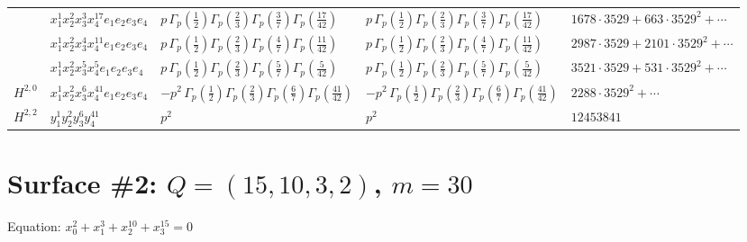 \documentclass[11pt]{article}
\begin{document}
\begin{table}[ht]
{\begin{tabular}{@{}lllll@{}}
 & $x_{1}^{1} x_{2}^{2} x_{3}^{3} x_{4}^{17}  e_{1} e_{2} e_{3} e_{4}$ & $p \, \Gamma_p \left( \frac{1}{2} \right) \Gamma_p \left( \frac{2}{3} \right) \Gamma_p \left( \frac{3}{7} \right) \Gamma_p \left( \frac{17}{42} \right)$ & $p \, \Gamma_p \left( \frac{1}{2} \right) \Gamma_p \left( \frac{2}{3} \right) \Gamma_p \left( \frac{3}{7} \right) \Gamma_p \left( \frac{17}{42} \right)$ & $1678{\cdot}3529{+}663{\cdot}3529^{2}{+}\cdots$ \\
 & $x_{1}^{1} x_{2}^{2} x_{3}^{4} x_{4}^{11}  e_{1} e_{2} e_{3} e_{4}$ & $p \, \Gamma_p \left( \frac{1}{2} \right) \Gamma_p \left( \frac{2}{3} \right) \Gamma_p \left( \frac{4}{7} \right) \Gamma_p \left( \frac{11}{42} \right)$ & $p \, \Gamma_p \left( \frac{1}{2} \right) \Gamma_p \left( \frac{2}{3} \right) \Gamma_p \left( \frac{4}{7} \right) \Gamma_p \left( \frac{11}{42} \right)$ & $2987{\cdot}3529{+}2101{\cdot}3529^{2}{+}\cdots$ \\
 & $x_{1}^{1} x_{2}^{2} x_{3}^{5} x_{4}^{5}  e_{1} e_{2} e_{3} e_{4}$ & $p \, \Gamma_p \left( \frac{1}{2} \right) \Gamma_p \left( \frac{2}{3} \right) \Gamma_p \left( \frac{5}{7} \right) \Gamma_p \left( \frac{5}{42} \right)$ & $p \, \Gamma_p \left( \frac{1}{2} \right) \Gamma_p \left( \frac{2}{3} \right) \Gamma_p \left( \frac{5}{7} \right) \Gamma_p \left( \frac{5}{42} \right)$ & $3521{\cdot}3529{+}531{\cdot}3529^{2}{+}\cdots$ \\
\midrule
$H^{2,0}$ & $x_{1}^{1} x_{2}^{2} x_{3}^{6} x_{4}^{41}  e_{1} e_{2} e_{3} e_{4}$ & $- p^{2} \, \Gamma_p \left( \frac{1}{2} \right) \Gamma_p \left( \frac{2}{3} \right) \Gamma_p \left( \frac{6}{7} \right) \Gamma_p \left( \frac{41}{42} \right)$ & $- p^{2} \, \Gamma_p \left( \frac{1}{2} \right) \Gamma_p \left( \frac{2}{3} \right) \Gamma_p \left( \frac{6}{7} \right) \Gamma_p \left( \frac{41}{42} \right)$ & $2288{\cdot}3529^{2}{+}\cdots$ \\
\midrule
$H^{2,2}$ & $y_{1}^{1} y_{2}^{2} y_{3}^{6} y_{4}^{41}$ & $p^{2} \,$ & $p^{2} \,$ & $12453841$ \\
\bottomrule
\end{tabular}
}
\renewcommand{\arraystretch}{1.0}
\end{table}

\newpage

\section*{Surface \#2: $Q=(15, 10, 3, 2)$, $m=30$}

Equation: $x_0^{2} + x_1^{3} + x_2^{10} + x_3^{15} = 0$
\end{document}
